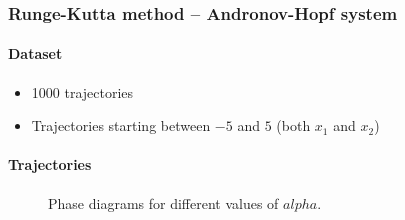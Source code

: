 \begin{frame}
	\frametitle{Runge-Kutta method -- Andronov-Hopf system}
	\paragraph{Dataset}\vspace{-2mm}
	\begin{itemize}
		\item 1000 trajectories
		\item Trajectories starting between $-5$ and $5$ (both $x_1$ and $x_2$)
	\end{itemize}
	\paragraph{Trajectories}\vspace{-2mm}
	\begin{figure}[H]
		\quad
		\quad
		\caption{Phase diagrams for different values of $alpha$.}
	\end{figure}
\end{frame}

